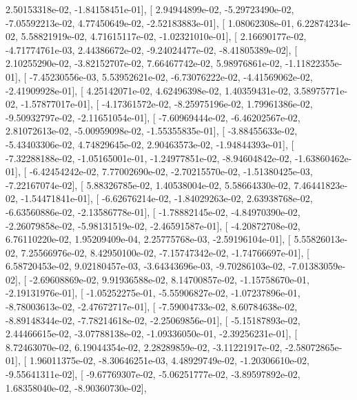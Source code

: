 \documentclass{article}
\begin{document}
          2.50153318e-02,  -1.84158451e-01],
       [  2.94944899e-02,  -5.29723490e-02,  -7.05592213e-02,
          4.77450649e-02,  -2.52183883e-01],
       [  1.08062308e-01,   6.22874234e-02,   5.58821919e-02,
          4.71615117e-02,  -1.02321010e-01],
       [  2.16690177e-02,  -4.71774761e-03,   2.44386672e-02,
         -9.24024477e-02,  -8.41805389e-02],
       [  2.10255290e-02,  -3.82152707e-02,   7.66467742e-02,
          5.98976861e-02,  -1.11822355e-01],
       [ -7.45230556e-03,   5.53952621e-02,  -6.73076222e-02,
         -4.41569062e-02,  -2.41909928e-01],
       [  4.25142071e-02,   4.62496398e-02,   1.40359431e-02,
          3.58975771e-02,  -1.57877017e-01],
       [ -4.17361572e-02,  -8.25975196e-02,   1.79961386e-02,
         -9.50932797e-02,  -2.11651054e-01],
       [ -7.60969444e-02,  -6.46202567e-02,   2.81072613e-02,
         -5.00959098e-02,  -1.55355835e-01],
       [ -3.88455633e-02,  -5.43403306e-02,   4.74829645e-02,
          2.90463573e-02,  -1.94844393e-01],
       [ -7.32288188e-02,  -1.05165001e-01,  -1.24977851e-02,
         -8.94604842e-02,  -1.63860462e-01],
       [ -6.42454242e-02,   7.77002690e-02,  -2.70215570e-02,
         -1.51380425e-03,  -7.22167074e-02],
       [  5.88326785e-02,   1.40538004e-02,   5.58664330e-02,
          7.46441823e-02,  -1.54471841e-01],
       [ -6.62676214e-02,  -1.84029263e-02,   2.63938768e-02,
         -6.63560886e-02,  -2.13586778e-01],
       [ -1.78882145e-02,  -4.84970390e-02,  -2.26079858e-02,
         -5.98131519e-02,  -2.46591587e-01],
       [ -4.20872708e-02,   6.76110220e-02,   1.95209409e-04,
          2.25775768e-03,  -2.59196104e-01],
       [  5.55826013e-02,   7.25566976e-02,   8.42950100e-02,
         -7.15747342e-02,  -1.74766697e-01],
       [  6.58720453e-02,   9.02180457e-03,  -3.64343696e-03,
         -9.70286103e-02,  -7.01383059e-02],
       [ -2.69608869e-02,   9.91936588e-02,   8.14700857e-02,
         -1.15758670e-01,  -2.19131976e-01],
       [ -1.05252275e-01,  -5.55906827e-02,  -1.07237896e-01,
         -8.78003613e-02,  -2.47672717e-01],
       [ -7.59004733e-02,   8.60784638e-02,  -8.89148344e-02,
         -7.78214618e-02,  -2.25069856e-01],
       [ -5.15187893e-02,   2.44466615e-02,  -3.07788138e-02,
         -1.09336050e-01,  -2.39256231e-01],
       [  8.72463070e-02,   6.19044354e-02,   2.28289859e-02,
         -3.11221917e-02,  -2.58072865e-01],
       [  1.96011375e-02,  -8.30646251e-03,   4.48929749e-02,
         -1.20306610e-02,  -9.55641311e-02],
       [ -9.67769307e-02,  -5.06251777e-02,  -3.89597892e-02,
          1.68358040e-02,  -8.90360730e-02],
\end{document}
